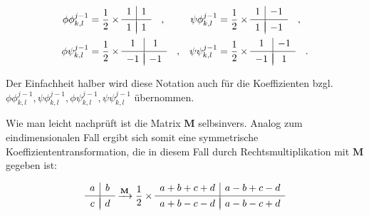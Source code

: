 \documentclass{article}
\begin{document}
\begin{align*}
\phi\phi_{k,l}^{j-1} &=
\frac{1}{2} \times
\begin{array}{c|c}
1 & 1 \\[.05cm] 
\hline \\[-0.35cm]
1 & 1
\end{array}
\quad , &
\psi\phi_{k,l}^{j-1} &=
\frac{1}{2} \times
\begin{array}{c|c}
1 & -1 \\[.05cm] 
\hline \\[-0.35cm]
1 & -1
\end{array}
\quad , \\
\phi\psi_{k,l}^{j-1} &=
\frac{1}{2} \times
\begin{array}{c|c}
1 & 1 \\[.05cm] 
\hline \\[-0.35cm]
-1 & -1
\end{array}
\quad , &
\psi\psi_{k,l}^{j-1} &=
\frac{1}{2} \times
\begin{array}{c|c}
1 & -1 \\[.05cm] 
\hline \\[-0.35cm]
-1 & 1
\end{array}
\quad .
\end{align*}

\noindent Der Einfachheit halber wird diese Notation auch für die Koeffizienten bzgl. $\phi\phi_{k,l}^{j-1}, \psi\phi_{k,l}^{j-1}, \phi\psi_{k,l}^{j-1}, \psi\psi_{k,l}^{j-1}$ übernommen.

\noindent Wie man leicht nachprüft ist die Matrix $\mathbf{M}$ selbsinvers. Analog zum eindimensionalen Fall ergibt sich somit eine symmetrische Koeffiziententransformation, die in diesem Fall durch Rechtsmultiplikation mit $\mathbf{M}$ gegeben ist:

\[
\begin{array}{c|c}
a & b \\[.05cm] 
\hline \\[-0.35cm]
c & d
\end{array}
\xrightarrow[]{\mathbf{M}}
\frac{1}{2} \times
\begin{array}{c|c}
a+b+c+d & a-b+c-d \\[.05cm] 
\hline \\[-0.35cm]
a+b-c-d & a-b-c+d
\end{array}
\]


\end{document}

